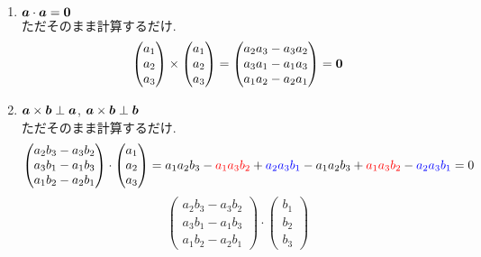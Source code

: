 \documentclass{jsarticle}
\newcommand*{\mbold}[1]{\mbox{\boldmath $#1$}}
\begin{document}
\begin{enumerate}
  \item $\mbold{a} \cdot \mbold{a} = \mbold{0}$ \\
    ただそのまま計算するだけ. \\
    \[
      \begin{pmatrix}
        a_1 \\
        a_2 \\
        a_3
      \end{pmatrix}
      \times
      \begin{pmatrix}
        a_1 \\
        a_2 \\
        a_3
      \end{pmatrix}
      =
      \begin{pmatrix}
        a_2 a_3 - a_3 a_2 \\
        a_3 a_1 - a_1 a_3 \\
        a_1 a_2 - a_2 a_1
      \end{pmatrix}
      = \mbold{0}
    \]
  \item $\mbold{a} \times \mbold{b} \perp \mbold{a}$, $\mbold{a} \times \mbold{b} \perp \mbold{b}$ \\
    ただそのまま計算するだけ. \\
    \[
      \begin{pmatrix}
        a_2 b_3 - a_3 b_2 \\
        a_3 b_1 - a_1 b_3 \\
        a_1 b_2 - a_2 b_1
      \end{pmatrix}
      \cdot
      \begin{pmatrix}
        a_1 \\
        a_2 \\
        a_3
      \end{pmatrix}
      = a_1 a_2 b_3 - \textcolor{red}{a_1 a_3 b_2} + \textcolor{blue}{a_2 a_3 b_1} - a_1 a_2 b_3 + \textcolor{red}{a_1 a_3 b_2} - \textcolor{blue}{a_2 a_3 b_1} = 0 
    \]
    \[
      \begin{pmatrix}
        a_2 b_3 - a_3 b_2 \\
        a_3 b_1 - a_1 b_3 \\
        a_1 b_2 - a_2 b_1
      \end{pmatrix}
      \cdot
      \begin{pmatrix}
        b_1 \\
        b_2 \\
        b_3
      \end{pmatrix}
\]
\end{enumerate}
\end{document}
